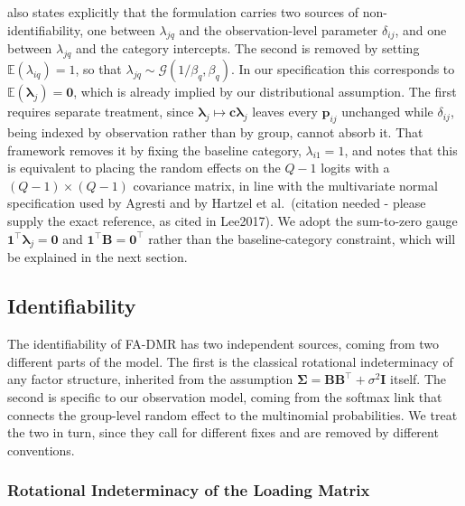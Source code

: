\citet{Lee2017} also states explicitly that the formulation carries two sources of non-identifiability, one between $\lambda_{jq}$ and the observation-level parameter $\delta_{ij}$, and one between $\lambda_{jq}$ and the category intercepts. The second is removed by setting $\mathbb{E}(\lambda_{iq})=1$, so that $\lambda_{jq}\sim\mathcal{G}(1/\beta_q,\beta_q)$. In our specification this corresponds to $\mathbb{E}(\bm\lambda_j)=\bm0$, which is already implied by our distributional assumption. The first requires separate treatment, since $\bm{\lambda}_{j}\mapsto \bm{c}\bm{\lambda}_{j}$ leaves every $\bm{p}_{ij}$ unchanged while $\delta_{ij}$, being indexed by observation rather than by group, cannot absorb it. That framework removes it by fixing the baseline category, $\lambda_{i1}=1$, and notes that this is equivalent to placing the random effects on the $Q-1$ logits with a $(Q-1)\times(Q-1)$ covariance matrix, in line with the multivariate normal specification used by Agresti and by Hartzel et al.\ (citation needed - please supply the exact reference, as cited in Lee2017). We adopt the sum-to-zero gauge $\mathbf{1}^\top\bm\lambda_j=\mathbf{0}$ and $\mathbf{1}^\top\mathbf{B}=\mathbf{0}^\top$ rather than the baseline-category constraint, which will be explained in the next section.

\subsection{Identifiability}
\label{subsec:identifiability}

The identifiability of FA-DMR has two independent sources, coming from two different parts of the model. The first is the classical rotational indeterminacy of any factor structure, inherited from the assumption $\bm{\Sigma}=\mathbf{B}\mathbf{B}^{\top}+\sigma^{2}\mathbf{I}$ itself. The second is specific to our observation model, coming from the softmax link that connects the group-level random effect to the multinomial probabilities. We treat the two in turn, since they call for different fixes and are removed by different conventions.

\subsubsection{Rotational Indeterminacy of the Loading Matrix}
\label{subsubsec:rotational-indeterminacy}

